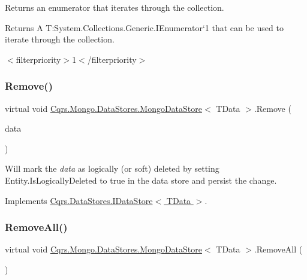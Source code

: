 Returns an enumerator that iterates through the collection. 

\begin{DoxyReturn}{Returns}
A T\+:\+System.\+Collections.\+Generic.\+I\+Enumerator`1 that can be used to iterate through the collection. 
\end{DoxyReturn}
$<$filterpriority$>$1$<$/filterpriority$>$ \mbox{\label{classCqrs_1_1Mongo_1_1DataStores_1_1MongoDataStore_a64003d01de3ac6ffd0e41bb7f572bf96}} 
\subsubsection{\texorpdfstring{Remove()}{Remove()}}
{\footnotesize\ttfamily virtual void \hyperlink{classCqrs_1_1Mongo_1_1DataStores_1_1MongoDataStore}{Cqrs.\+Mongo.\+Data\+Stores.\+Mongo\+Data\+Store}$<$ T\+Data $>$.Remove (\begin{DoxyParamCaption}\item[{T\+Data}]{data }\end{DoxyParamCaption})\hspace{0.3cm}{\ttfamily [virtual]}}



Will mark the {\itshape data}  as logically (or soft) deleted by setting Entity.\+Is\+Logically\+Deleted to true in the data store and persist the change. 



Implements \hyperlink{interfaceCqrs_1_1DataStores_1_1IDataStore_a7ef540796bbe4257296841590bc23478}{Cqrs.\+Data\+Stores.\+I\+Data\+Store$<$ T\+Data $>$}.

\mbox{\label{classCqrs_1_1Mongo_1_1DataStores_1_1MongoDataStore_a878966ea796321cae54c3c619e3178d5}} 
\subsubsection{\texorpdfstring{Remove\+All()}{RemoveAll()}}
{\footnotesize\ttfamily virtual void \hyperlink{classCqrs_1_1Mongo_1_1DataStores_1_1MongoDataStore}{Cqrs.\+Mongo.\+Data\+Stores.\+Mongo\+Data\+Store}$<$ T\+Data $>$.Remove\+All (\begin{DoxyParamCaption}{ }\end{DoxyParamCaption})\hspace{0.3cm}{\ttfamily [virtual]}}



